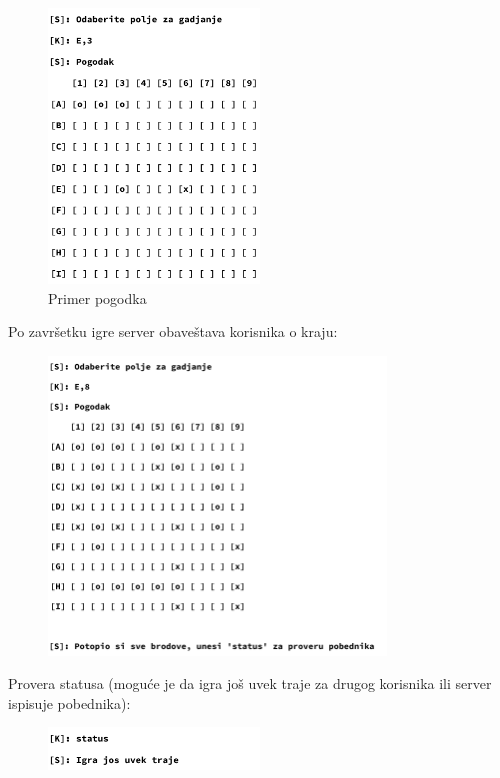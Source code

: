\begin{figure}[H]
    \centering
    \includegraphics[width=0.5\textwidth]{Slike/PTP/PTP_Pogodak.png}
    \caption*{Primer pogodka}
    \label{fig:ptp_pogodak}
\end{figure}

Po završetku igre server obaveštava korisnika o kraju:

\begin{figure}[H]
    \centering
    \includegraphics[width=0.8\textwidth]{Slike/PTP/PTP_Pobeda.png}
    \label{fig:ptp_pobeda}
\end{figure}

Provera statusa (moguće je da igra još uvek traje za drugog korisnika ili server ispisuje pobednika):

\begin{figure}[H]
    \centering
    \includegraphics[width=0.5\textwidth]{Slike/PTP/PTP_Status.png}
    \label{fig:ptp_status}
\end{figure}